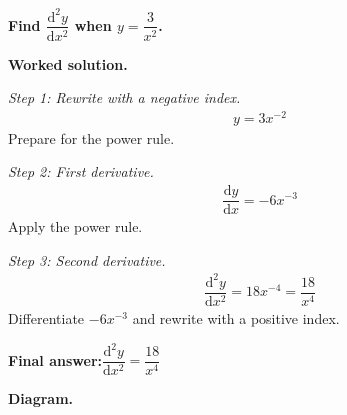 \documentclass[11pt]{article}
\newcommand{\question}[1]{\par\medskip\noindent\textbf{#1}\par}
\begin{document}
\question{Find \( \dfrac{\mathrm{d}^2y}{\mathrm{d}x^2} \) when \( y = \dfrac{3}{x^2} \).}

\textbf{Worked solution.}

\textit{Step 1: Rewrite with a negative index.}
\[\begin{gathered}
y = 3x^{-2}
\end{gathered}\]
Prepare for the power rule.

\textit{Step 2: First derivative.}
\[\begin{gathered}
\dfrac{\mathrm{d}y}{\mathrm{d}x} = -6x^{-3}
\end{gathered}\]
Apply the power rule.

\textit{Step 3: Second derivative.}
\[\begin{gathered}
\dfrac{\mathrm{d}^2y}{\mathrm{d}x^2} = 18x^{-4} = \dfrac{18}{x^4}
\end{gathered}\]
Differentiate \( -6x^{-3} \) and rewrite with a positive index.

\begin{answerbox}
\textbf{Final answer:}\quad \(\displaystyle  \dfrac{\mathrm{d}^2y}{\mathrm{d}x^2} = \dfrac{18}{x^4} \)
\end{answerbox}
\textbf{Diagram.}
\end{document}
